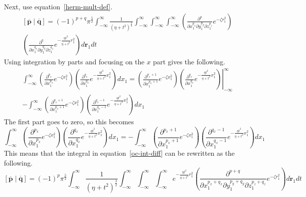 Next, use equation~\ref{herm-mult-def}.
\begin{multline}
  \left[\overline{\mathbf{p}}\middle|\overline{\mathbf{q}}\right] = (-1)^{p + q} \pi^{\frac{5}{2}} \int_{-\infty}^\infty \frac{1}{\left(\eta + t^2\right)^{\frac{3}{2}}} \int_{-\infty}^\infty \int_{-\infty}^\infty \int_{-\infty}^\infty \left(\frac{\partial^{p}}{\partial x_1^{p_x}\partial y_1^{p_y}\partial z_1^{p_z}}e^{-\zeta r_1^2}\right)\\
  \left(\frac{\partial^{q}}{\partial x_1^{q_x} \partial y_1^{q_y} \partial z_1^{q_z}} e^{-\frac{\eta t^2}{\eta + t^2} r_1^2}\right) d\mathbf{r}_1 dt
  \label{oc-int-diff}
\end{multline}
Using integration by parts and focusing on the $x$ part gives the following.
\begin{multline}
  \int_{-\infty}^\infty \left(\frac{\partial^{p_x}}{\partial x_1^{p_x}} e^{-\zeta x_1^2}\right)\left(\frac{\partial^{q_x}}{\partial x_1^{q_x}} e^{-\frac{\eta t^2}{\eta + t^2} x_1^2}\right) dx_1 = \left.\left(\frac{\partial^{p_x + 1}}{\partial x_1^{p_x + 1}} e^{-\zeta x_1^2}\right)\left(\frac{\partial^{q_x}}{\partial x_1^{q_x}}e^{-\frac{\eta t^2}{\eta + t^2} x_1^2}\right)\right|_{-\infty}^\infty\\
  - \int_{-\infty}^\infty  \left(\frac{\partial^{p_x + 1}}{\partial x_1^{p_x + 1}} e^{-\zeta x_1^2}\right)\left(\frac{\partial^{q_x - 1}}{\partial x_1^{q_x - 1}} e^{-\frac{\eta t^2}{\eta + t^2} x_1^2}\right) dx_1
\end{multline}
The first part goes to zero, so this becomes
\begin{equation}
  \int_{-\infty}^\infty \left(\frac{\partial^{p_x}}{\partial x_1^{p_x}} e^{-\zeta x_1^2}\right)\left(\frac{\partial^{q_x}}{\partial x_1^{q_x}} e^{-\frac{\eta t^2}{\eta + t^2} x_1^2}\right) dx_1 =  - \int_{-\infty}^\infty  \left(\frac{\partial^{p_x + 1}}{\partial x_1^{p_x + 1}} e^{-\zeta x_1^2}\right)\left(\frac{\partial^{q_x - 1}}{\partial x_1^{q_x - 1}} e^{-\frac{\eta t^2}{\eta + t^2} x_1^2}\right) dx_1
\end{equation}
This means that the integral in equation~\ref{oc-int-diff} can be rewritten as the following.
\begin{equation}
  \left[\overline{\mathbf{p}}\middle|\overline{\mathbf{q}}\right] = (-1)^{p} \pi^{\frac{5}{2}} \int_{-\infty}^\infty \frac{1}{\left(\eta + t^2\right)^{\frac{3}{2}}} \int_{-\infty}^\infty \int_{-\infty}^\infty \int_{-\infty}^\infty e^{-\frac{\eta t^2}{\eta + t^2} r_1^2} \left(\frac{\partial^{p + q}}{\partial x_1^{p_x + q_x} \partial y_1^{p_y + q_y} \partial z_1^{p_z + q_z}} e^{-\zeta r_1^2}\right) d\mathbf{r}_1 dt
\end{equation}
